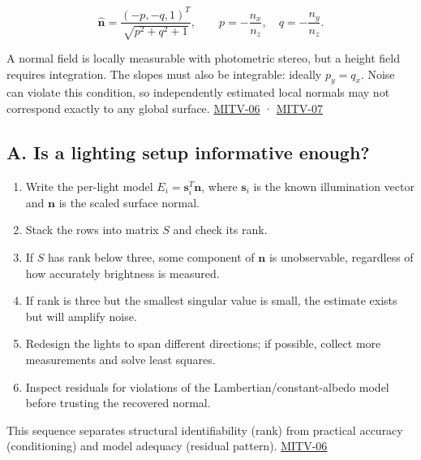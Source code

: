 \[
\hat{\mathbf{n}}=\frac{(-p,-q,1)^T}{\sqrt{p^2+q^2+1}},\qquad p=-\frac{n_x}{n_z},\quad q=-\frac{n_y}{n_z}.
\]

A normal field is locally measurable with photometric stereo, but a height field requires integration. The slopes must also be integrable: ideally \(p_y=q_x\). Noise can violate this condition, so independently estimated local normals may not correspond exactly to any global surface. \hyperref[04-visual-computing-ii-ch036-mitv-06---photometric-stereo-noise-gain-error-amplification-eigenvalues-and-eigenvectors-review]{MITV-06} · \hyperref[04-visual-computing-ii-ch036-mitv-07---gradient-space-reflectance-map-image-irradiance-equation-gnomonic-projection]{MITV-07}

\subsection{A. Is a lighting setup informative enough?}\label{04-visual-computing-ii-ch032-a.-is-a-lighting-setup-informative-enough}

\hypertarget{04-visual-computing-ii-ch032-a.-is-a-lighting-setup-informative-enough}{}

\begin{enumerate}
\def\labelenumi{\arabic{enumi}.}
\tightlist
\item
  Write the per-light model \(E_i=\mathbf{s}_i^T\mathbf{n}\), where \(\mathbf{s}_i\) is the known illumination vector and \(\mathbf{n}\) is the scaled surface normal.
\item
  Stack the rows into matrix \(S\) and check its rank.
\item
  If \(S\) has rank below three, some component of \(\mathbf{n}\) is unobservable, regardless of how accurately brightness is measured.
\item
  If rank is three but the smallest singular value is small, the estimate exists but will amplify noise.
\item
  Redesign the lights to span different directions; if possible, collect more measurements and solve least squares.
\item
  Inspect residuals for violations of the Lambertian/constant-albedo model before trusting the recovered normal.
\end{enumerate}

This sequence separates structural identifiability (rank) from practical accuracy (conditioning) and model adequacy (residual pattern). \hyperref[04-visual-computing-ii-ch036-mitv-06---photometric-stereo-noise-gain-error-amplification-eigenvalues-and-eigenvectors-review]{MITV-06}

